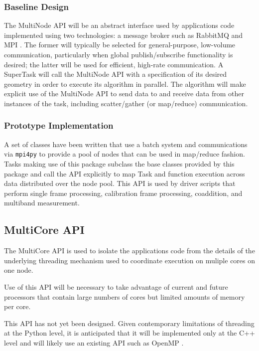 \documentclass[DM,lsstdraft,toc]{lsstdoc}
\begin{document}
\subsubsection{Baseline Design}\label{multinode-design}

The MultiNode API will be an abstract interface used by applications code
implemented using two technologies: a message broker such as RabbitMQ
\citep{RabbitMQ} and MPI \citep{MPI}. The former will typically be selected for
general-purpose, low-volume communication, particularly when global
publish/subscribe functionality is desired; the latter will be used for
efficient, high-rate communication. A SuperTask will call the MultiNode API
with a specification of its desired geometry in order to execute its algorithm
in parallel. The algorithm will make explicit use of the MultiNode API to send
data to and receive data from other instances of the task, including
scatter/gather (or map/reduce) communication.

\subsubsection{Prototype Implementation}\label{multinode-implementation}

A set of classes have been written that use a batch system and communications
via \texttt{mpi4py} \citep{mpi4py} to provide a pool of nodes that can be used
in map/reduce fashion.  Tasks making use of this package subclass the base
classes provided by this package and call the API explicitly to map Task and
function execution across data distributed over the node pool.  This API is
used by driver scripts that perform single frame processing, calibration frame
processing, coaddition, and multiband measurement.


\subsection{MultiCore API}\label{multicore-api}

The MultiCore API is used to isolate the applications code from the details of
the underlying threading mechanism used to coordinate execution on muliple
cores on one node.

Use of this API will be necessary to take advantage of current and future
processors that contain large numbers of cores but limited amounts of memory
per core.

This API has not yet been designed.  Given contemporary limitations of
threading at the Python level, it is anticipated that it will be implemented
only at the C++ level and will likely use an existing API such as OpenMP
\citep{OpenMP}.
\end{document}
